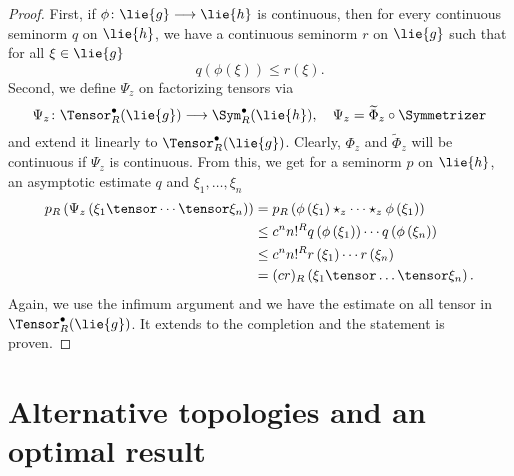 \begin{proof}
	First, if $\phi \colon \lie{g} \longrightarrow \lie{h}$ is continuous, 
	then for every continuous seminorm $q$ on $\lie{h}$, we have a continuous 
	seminorm $r$ on $\lie{g}$ such that for all $\xi \in \lie{g}$
	\begin{equation*}
		q\left( \phi(\xi) \right)
		\leq
		r(\xi).
	\end{equation*}
	Second, we define $\Psi_z$ on factorizing tensors via
	\begin{equation*}
		\Psi_z \colon
		\Tensor_R^{\bullet}(\lie{g})
		\longrightarrow
		\Sym_R^{\bullet}(\lie{h})
		, \quad
		\Psi_z
		=
		\widetilde{\Phi}_z \circ
		\Symmetrizer
	\end{equation*}
	and extend it linearly to $\Tensor_R^{\bullet}(\lie{g})$. Clearly, 
	$\Phi_z$ and $\widetilde{\Phi}_z$ will be continuous if $\Psi_z$ is 
	continuous. From this, we get for a seminorm $p$ on $\lie{h}$, an 
	asymptotic estimate $q$ and $\xi_1, \ldots, \xi_n$
	\begin{align*}
		p_R\left(
			\Psi_z \left(
				\xi_1 \tensor \cdots \tensor \xi_n
			\right)
		\right)
		& =
		p_R \left(
			\phi \left( \xi_1 \right)
			\star_z \cdots \star_z
			\phi \left( \xi_1 \right)
		\right)
		\\
		& \leq
		c^n n!^R
		q \left( \phi \left( \xi_1 \right) \right)
		\cdots
		q \left( \phi \left( \xi_n \right) \right)
		\\
		& \leq
		c^n n!^R
		r \left( \xi_1 \right)
		\cdots
		r \left( \xi_n \right)
		\\
		& =
		(c r)_R\left( 
			\xi_1 \tensor \ldots \tensor \xi_n
		\right).
	\end{align*}
	Again, we use the infimum argument and we have the estimate on all tensor 
	in $\Tensor_R^{\bullet}(\lie{g})$. It extends to the completion and the 
	statement is proven.
\end{proof}



\section{Alternative topologies and an optimal result}
\label{sec:chap5_Optimality}

